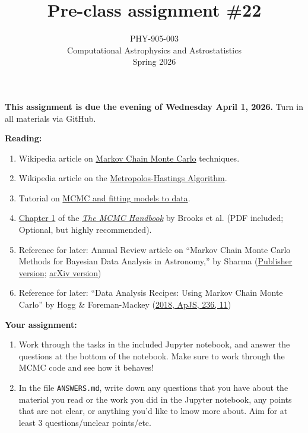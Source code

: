 \documentclass[10pt]{article}
\title{Pre-class assignment \#22}
\author{PHY-905-003\\Computational Astrophysics and
  Astrostatistics\\Spring 2026}
\date{} %
\begin{document}
 
\maketitle

\vspace{-10mm}

\noindent
\textbf{This assignment is due the evening of Wednesday April 1, 2026.}
 Turn in all materials via GitHub.

\vspace{5mm}

\noindent
\textbf{Reading:}

\begin{enumerate}

\item Wikipedia article on
  \href{https://en.wikipedia.org/wiki/Markov\_chain\_Monte\_Carlo}{Markov
    Chain Monte Carlo} techniques.

\item Wikipedia article on the
  \href{https://en.wikipedia.org/wiki/Metropolis\%E2\%80\%93Hastings_algorithm}{Metropolos-Hastings
    Algorithm}.

\item Tutorial on
  \href{https://sciencehouse.wordpress.com/2010/06/23/mcmc-and-fitting-models-to-data/}{MCMC
  and fitting models to data}.

\item \href{http://www.mcmchandbook.net/HandbookChapter1.pdf}{Chapter 1} of the
  \href{http://www.mcmchandbook.net/}{\textit{The MCMC Handbook}} by
  Brooks et al.  (PDF included; Optional, but highly recommended).

\item Reference for later:  Annual Review article on ``Markov Chain Monte Carlo Methods for
  Bayesian Data Analysis in Astronomy,'' by Sharma (\href{https://www.annualreviews.org/doi/10.1146/annurev-astro-082214-122339}{Publisher
    version}; \href{https://arxiv.org/abs/1706.01629}{arXiv version})

\item Reference for later:  ``Data Analysis Recipes: Using Markov
  Chain Monte Carlo'' by Hogg \& Foreman-Mackey
  (\href{https://iopscience.iop.org/article/10.3847/1538-4365/aab76e}{2018,
  ApJS, 236, 11})

\end{enumerate}

\noindent
\textbf{Your assignment:}

\begin{enumerate}

\item Work through the tasks in the included Jupyter notebook, and
answer the questions at the bottom of the notebook.  Make sure to work
through the MCMC code and see how it behaves!

\item In the file \texttt{ANSWERS.md}, write down any questions that
you have about the material you read or the work you did in the
Jupyter notebook, any points that are not clear, or anything you'd
like to know more about.  Aim for at
least 3 questions/unclear points/etc. 

\end{enumerate}
\end{document}
